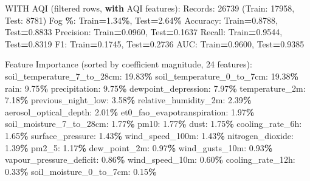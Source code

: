 \documentclass[
  letterpaper,
  DIV=11,
  numbers=noendperiod]{scrartcl}
\newenvironment{Shaded}{\begin{snugshade}}{\end{snugshade}}
\newcommand{\BuiltInTok}[1]{#1}
\newcommand{\ControlFlowTok}[1]{\textcolor[rgb]{0.13,0.29,0.53}{\textbf{#1}}}
\newcommand{\DecValTok}[1]{\textcolor[rgb]{0.00,0.00,0.81}{#1}}
\newcommand{\FloatTok}[1]{\textcolor[rgb]{0.00,0.00,0.81}{#1}}
\newcommand{\NormalTok}[1]{#1}
\newcommand{\OperatorTok}[1]{\textcolor[rgb]{0.81,0.36,0.00}{\textbf{#1}}}
\begin{document}
\begin{Shaded}
\begin{Highlighting}[]
\NormalTok{WITH AQI (filtered rows, }\ControlFlowTok{with}\NormalTok{ AQI features):}
\NormalTok{  Records: }\DecValTok{26739}\NormalTok{ (Train: }\DecValTok{17958}\NormalTok{, Test: }\DecValTok{8781}\NormalTok{)}
\NormalTok{  Fog }\OperatorTok{\%}\NormalTok{: Train}\OperatorTok{=}\FloatTok{1.34}\OperatorTok{\%}\NormalTok{, Test}\OperatorTok{=}\FloatTok{2.64}\OperatorTok{\%}
\NormalTok{  Accuracy: Train}\OperatorTok{=}\FloatTok{0.8788}\NormalTok{, Test}\OperatorTok{=}\FloatTok{0.8833}
\NormalTok{  Precision: Train}\OperatorTok{=}\FloatTok{0.0960}\NormalTok{, Test}\OperatorTok{=}\FloatTok{0.1637}
\NormalTok{  Recall: Train}\OperatorTok{=}\FloatTok{0.9544}\NormalTok{, Test}\OperatorTok{=}\FloatTok{0.8319}
\NormalTok{  F1: Train}\OperatorTok{=}\FloatTok{0.1745}\NormalTok{, Test}\OperatorTok{=}\FloatTok{0.2736}
\NormalTok{  AUC: Train}\OperatorTok{=}\FloatTok{0.9600}\NormalTok{, Test}\OperatorTok{=}\FloatTok{0.9385}

\NormalTok{  Feature Importance (}\BuiltInTok{sorted}\NormalTok{ by coefficient magnitude, }\DecValTok{24}\NormalTok{ features):}
\NormalTok{    soil\_temperature\_7\_to\_28cm: }\FloatTok{19.83}\OperatorTok{\%}
\NormalTok{    soil\_temperature\_0\_to\_7cm: }\FloatTok{19.38}\OperatorTok{\%}
\NormalTok{    rain: }\FloatTok{9.75}\OperatorTok{\%}
\NormalTok{    precipitation: }\FloatTok{9.75}\OperatorTok{\%}
\NormalTok{    dewpoint\_depression: }\FloatTok{7.97}\OperatorTok{\%}
\NormalTok{    temperature\_2m: }\FloatTok{7.18}\OperatorTok{\%}
\NormalTok{    previous\_night\_low: }\FloatTok{3.58}\OperatorTok{\%}
\NormalTok{    relative\_humidity\_2m: }\FloatTok{2.39}\OperatorTok{\%}
\NormalTok{    aerosol\_optical\_depth: }\FloatTok{2.01}\OperatorTok{\%}
\NormalTok{    et0\_fao\_evapotranspiration: }\FloatTok{1.97}\OperatorTok{\%}
\NormalTok{    soil\_moisture\_7\_to\_28cm: }\FloatTok{1.77}\OperatorTok{\%}
\NormalTok{    pm10: }\FloatTok{1.77}\OperatorTok{\%}
\NormalTok{    dust: }\FloatTok{1.75}\OperatorTok{\%}
\NormalTok{    cooling\_rate\_6h: }\FloatTok{1.65}\OperatorTok{\%}
\NormalTok{    surface\_pressure: }\FloatTok{1.43}\OperatorTok{\%}
\NormalTok{    wind\_speed\_100m: }\FloatTok{1.43}\OperatorTok{\%}
\NormalTok{    nitrogen\_dioxide: }\FloatTok{1.39}\OperatorTok{\%}
\NormalTok{    pm2\_5: }\FloatTok{1.17}\OperatorTok{\%}
\NormalTok{    dew\_point\_2m: }\FloatTok{0.97}\OperatorTok{\%}
\NormalTok{    wind\_gusts\_10m: }\FloatTok{0.93}\OperatorTok{\%}
\NormalTok{    vapour\_pressure\_deficit: }\FloatTok{0.86}\OperatorTok{\%}
\NormalTok{    wind\_speed\_10m: }\FloatTok{0.60}\OperatorTok{\%}
\NormalTok{    cooling\_rate\_12h: }\FloatTok{0.33}\OperatorTok{\%}
\NormalTok{    soil\_moisture\_0\_to\_7cm: }\FloatTok{0.15}\OperatorTok{\%}


\end{Highlighting}
\end{Shaded}
\end{document}
